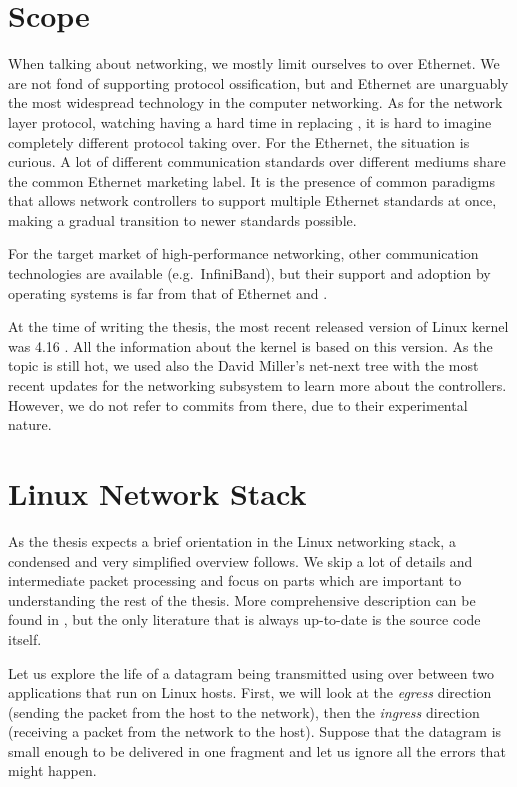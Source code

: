 \section{Scope}

When talking about networking, we mostly limit ourselves to  over Ethernet.
We are not fond of supporting protocol ossification, but  and Ethernet are
unarguably the most widespread technology in the computer networking. As for the
network layer protocol, watching  having a hard time in replacing
, it is hard to imagine completely different protocol taking over. For
the Ethernet, the situation is curious. A lot of different communication
standards over different mediums share the common Ethernet marketing label. It
is the presence of common paradigms that allows network controllers to support
multiple Ethernet standards at once, making a gradual transition to newer
standards possible.

For the target market of high-performance networking, other communication
technologies are available (e.g.\ InfiniBand), but their support and adoption by
operating systems is far from that of Ethernet and .

At the time of writing the thesis, the most recent released version of Linux
kernel was 4.16 \cite{linux-kernel}. All the information about the kernel is
based on this version. As the topic is still hot, we used also the David
Miller's net-next tree \cite{net-next} with the most recent updates for the networking subsystem to
learn more about the controllers. However, we do not refer to commits from
there, due to their experimental nature.

\section{Linux Network Stack}

As the thesis expects a brief orientation in the Linux networking stack,
a condensed and very simplified overview follows. We skip a lot of details and
intermediate packet processing and focus on parts which are important to
understanding the rest of the thesis. More comprehensive description can be
found in \cite{lkn-iat}, but the only literature that is always up-to-date is
the source code itself.

Let us explore the life of a datagram being transmitted using  over
 between two applications that run on Linux hosts. First, we will look
at the \emph{egress} direction (sending the packet from the host to the
network), then the \emph{ingress} direction (receiving a packet from the
network to the host). Suppose that the datagram is small enough to be delivered
in one  fragment and let us ignore all the errors that might happen.

